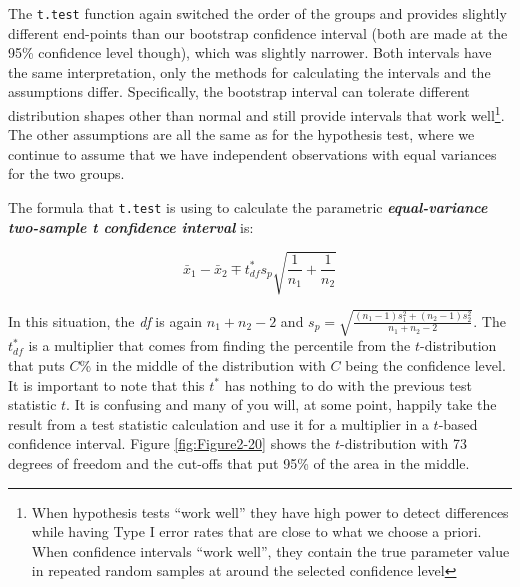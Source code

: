 \documentclass[]{book}
\let\rmarkdownfootnote\footnote%
\def\footnote{\protect\rmarkdownfootnote}
\begin{document}
The \texttt{t.test} function again switched the order of the groups and
provides slightly different end-points than our bootstrap confidence
interval (both are made at the 95\% confidence level though), which was
slightly narrower. Both intervals have the same interpretation, only the
methods for calculating the intervals and the assumptions differ.
Specifically, the bootstrap interval can tolerate different distribution
shapes other than normal and still provide intervals that work
well\footnote{When hypothesis tests ``work well'' they have high power
  to detect differences while having Type I error rates that are close
  to what we choose a priori. When confidence intervals ``work well'',
  they contain the true parameter value in repeated random samples at
  around the selected confidence level}. The other assumptions are all
the same as for the hypothesis test, where we continue to assume that we
have independent observations with equal variances for the two groups.

The formula that \texttt{t.test} is using to calculate the parametric
\textbf{\emph{equal-variance two-sample t confidence interval}} is:

\[\bar{x}_1 - \bar{x}_2 \mp t^*_{df}s_p\sqrt{\frac{1}{n_1}+\frac{1}{n_2}}\]

In this situation, the \emph{df} is again \(n_1+n_2-2\) and
\(s_p = \sqrt{\frac{(n_1-1)s_1^2 + (n_2-1)s_2^2}{n_1+n_2-2}}\). The
\(t^*_{df}\) is a multiplier that comes from finding the percentile from
the \(t\)-distribution that puts \(C\)\% in the middle of the
distribution with \(C\) being the confidence level. It is important to
note that this \(t^*\) has nothing to do with the previous test
statistic \(t\). It is confusing and many of you will, at some point,
happily take the result from a test statistic calculation and use it for
a multiplier in a \(t\)-based confidence interval. Figure
\ref{fig:Figure2-20} shows the \(t\)-distribution with 73 degrees of
freedom and the cut-offs that put 95\% of the area in the middle.
\end{document}
